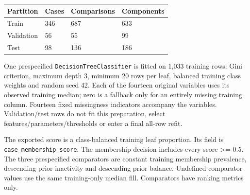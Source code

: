 \begin{longtable}[]{@{}llll@{}}
\toprule\noalign{}
Partition & Cases & Comparisons & Components \\
\midrule\noalign{}
\endhead
\bottomrule\noalign{}
\endlastfoot
Train & 346 & 687 & 633 \\
Validation & 56 & 55 & 99 \\
Test & 98 & 136 & 186 \\
\end{longtable}

One prespecified \texttt{DecisionTreeClassifier} is fitted on 1,033
training rows: Gini criterion, maximum depth 3, minimum 20 rows per
leaf, balanced training class weights and random seed 42. Each of the
fourteen original variables uses its observed training median; zero is a
fallback only for an entirely missing training column. Fourteen fixed
missingness indicators accompany the variables. Validation/test rows do
not fit this preparation, select features/parameters/thresholds or enter
a final all-row refit.

The exported score is a class-balanced training leaf proportion. Its
field is \texttt{case\_\allowbreak{}membership\_\allowbreak{}score}. The membership decision
includes every score \textgreater= 0.5. The three prespecified
comparators are constant training membership prevalence, descending
prior inactivity and descending prior balance. Undefined comparator
values use the same training-only median fill. Comparators have ranking
metrics only.

\endgroup
